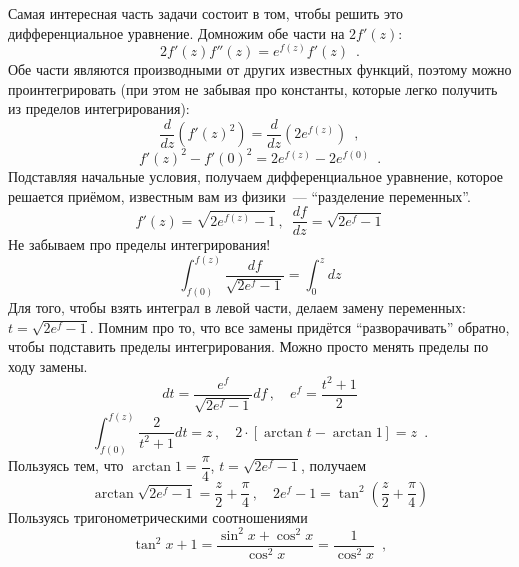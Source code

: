 \documentclass[a5paper]{article}
\theoremstyle{definition}
\begin{document}
Самая интересная часть задачи состоит в том, чтобы решить это дифференциальное
уравнение. Домножим обе части на \( 2 f'(z) \):
\begin{equation}
    2 f'(z) f''(z) = e^{f(z)} f'(z)
    \enspace .
\end{equation}
Обе части являются производными от других известных функций, поэтому можно
проинтегрировать (при этом не забывая про константы, которые легко получить из
пределов интегрирования):
\begin{equation}
    \dfrac{d}{dz} \left( f'(z)^2 \right) = \dfrac{d}{dz} \left( 2e^{f(z)} \right)
\enspace ,
\end{equation}
\begin{equation}
    f'(z)^2 - f'(0)^2 = 2e^{f(z)} - 2e^{f(0)}
    \enspace .
\end{equation}
Подставляя начальные условия, получаем дифференциальное уравнение, которое
решается приёмом, известным вам из физики~--- ``разделение переменных''.
\begin{equation}
    f'(z) = \sqrt{2e^{f(z)} - 1} \, , \enspace
    \dfrac{df}{dz} = \sqrt{2 e^{f} - 1}
\end{equation}
Не забываем про пределы интегрирования!
\begin{equation}
    \int_{f(0)}^{f(z)} \dfrac{df}{\sqrt{ 2e^f - 1}} = \int_0^z dz
\end{equation}
Для того, чтобы взять интеграл в левой части, делаем замену переменных: \( t =
\sqrt{2 e^f - 1} \). Помним про то, что все замены придётся ``разворачивать''
обратно, чтобы подставить пределы интегрирования. Можно просто менять пределы по
ходу замены. 
\begin{equation}
    dt = \dfrac{e^f}{\sqrt{2 e^f - 1}} df\, , 
    \quad
    e^f = \dfrac{t^2 + 1}{2}
\end{equation}
\begin{equation}
    \int_{f(0)}^{f(z)} \dfrac{2}{t^2 + 1} dt = z
    \, , \quad
    2 \cdot \left[\arctan t - \arctan 1 \right] = z 
    \enspace .
\end{equation}
Пользуясь тем, что \( \arctan 1 = \dfrac{\pi}{4} \), \( t = \sqrt{2 e^f - 1} \),
получаем
\begin{equation}
    \arctan \sqrt{2 e^f - 1} = \dfrac{z}{2} + \dfrac{\pi}{4}
    \, , \quad
    2 e^f - 1 = \tan^2 \left(  \dfrac{z}{2} + \dfrac{\pi}{4} \right)
\end{equation}
Пользуясь тригонометрическими соотношениями
\begin{equation}
    \tan^2 x + 1 = \dfrac{\sin^2 x + \cos^2 x}{\cos^2 x} = \dfrac{1}{\cos^2 x}
\enspace ,
\end{equation}
\end{document}
